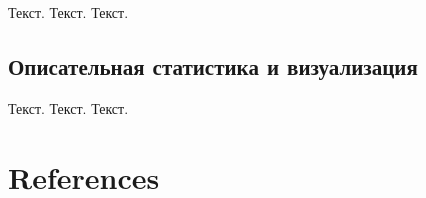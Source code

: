 \documentclass[
  letterpaper,
  DIV=11,
  numbers=noendperiod]{scrreprt}
\begin{document}
Текст. Текст. Текст.

\section{Описательная статистика и
визуализация}\label{ux43eux43fux438ux441ux430ux442ux435ux43bux44cux43dux430ux44f-ux441ux442ux430ux442ux438ux441ux442ux438ux43aux430-ux438-ux432ux438ux437ux443ux430ux43bux438ux437ux430ux446ux438ux44f-6}

Текст. Текст. Текст.


\chapter*{References}\label{references}


\label{refs}
\end{document}
